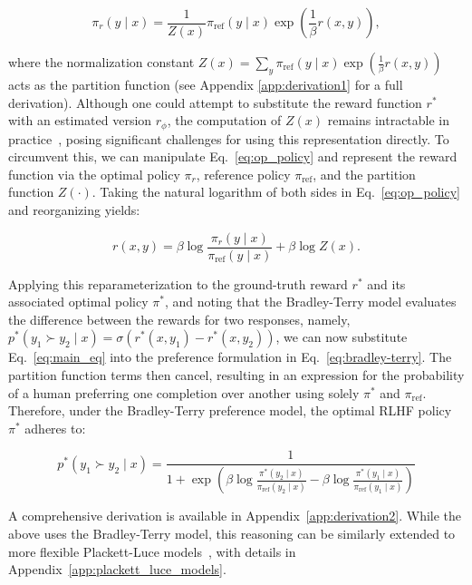 \begin{equation}\label{eq:op_policy}
    \pi_r(y\mid x) = \frac{1}{Z(x)}\pi_\text{ref}(y\mid x)\exp\left(\frac{1}{\beta}r(x, y)\right),
\end{equation}

where the normalization constant $Z(x) =\sum_{y}\pi_\text{ref}(y\mid x)\exp\left(\frac{1}{\beta}r(x, y)\right)$ acts as the partition function (see Appendix \ref{app:derivation1} for a full derivation). Although one could attempt to substitute the reward function $r^*$ with an estimated version $r_{\phi}$, the computation of $Z(x)$ remains intractable in practice~\citep{korbak2022reinforcement, go2023aligning}, posing significant challenges for using this representation directly. To circumvent this, we can manipulate Eq.~\ref{eq:op_policy} and represent the reward function via the optimal policy $\pi_r$, reference policy $\pi_\text{ref}$, and the partition function $Z(\cdot)$. Taking the natural logarithm of both sides in Eq.~\ref{eq:op_policy} and reorganizing yields:

\begin{equation}\label{eq:main_eq}
    r(x,y) =\beta \log \frac{\pi_r(y\mid x)}{\pi_\text{ref}(y\mid x)} + \beta \log Z(x).
\end{equation}

Applying this reparameterization to the ground-truth reward $r^*$ and its associated optimal policy $\pi^*$, and noting that the Bradley-Terry model evaluates the difference between the rewards for two responses, namely, ${p^*(y_1 \succ y_2 \mid x) = \sigma(r^*(x, y_1) - r^*(x, y_2))}$, we can now substitute Eq.~\ref{eq:main_eq} into the preference formulation in Eq.~\ref{eq:bradley-terry}. The partition function terms then cancel, resulting in an expression for the probability of a human preferring one completion over another using solely $\pi^*$ and $\pi_\text{ref}$. Therefore, under the Bradley-Terry preference model, the optimal RLHF policy $\pi^*$ adheres to:

\begin{equation}\label{eq:objective}
    p^*(y_1\succ y_2 \mid x)=\frac{1}{1 + \exp\left(\beta \log \frac{\pi^*(y_2\mid x)}{\pi_\text{ref}(y_2\mid x)} - \beta \log \frac{\pi^*(y_1\mid x)}{\pi_\text{ref}(y_1\mid x)}\right)}
\end{equation}

A comprehensive derivation is available in Appendix~\ref{app:derivation2}. While the above uses the Bradley-Terry model, this reasoning can be similarly extended to more flexible Plackett-Luce models~\citep{plackett1975analysis, luce2012individual}, with details in Appendix~\ref{app:plackett_luce_models}.

